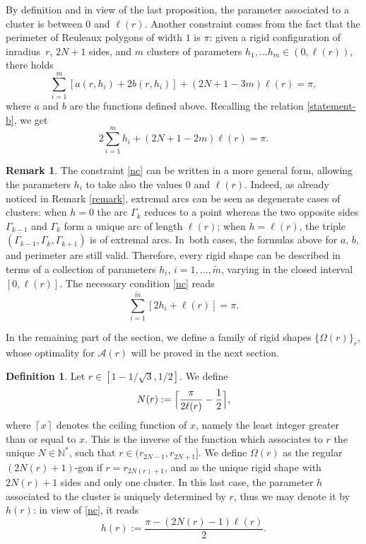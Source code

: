 \documentclass[11pt]{article}
\numberwithin{equation}{section}
\let\mathcal\mathscr
\theoremstyle{plain}
\theoremstyle{definition}
\newtheorem{definition}[theorem]{Definition}
\newtheorem{remark}[theorem]{Remark}
\newcommand\A{\mathcal A}
\let\B\Gamma
\begin{document}
By definition and in view of the last proposition, the parameter associated to a cluster is between $0$ and $\ell(r)$. Another constraint comes from the fact that the perimeter of Reuleaux polygons of width $1$ is $\pi$: given a rigid configuration of inradius~$r$, $2N+1$ sides, and $m$ clusters of parameters $h_1, \ldots h_m \in (0,\ell(r))$, there holds
\[
\sum_{i=1}^m [a(r,h_i) + 2 b(r,h_i)] + (2N+1-3m)\ell(r)=\pi,
\]
where $a$ and $b$ are the functions defined above. Recalling the relation \eqref{statement-b}, we get
\begin{equation}\label{nc}
2 \sum_{i=1}^m h_i + (2N+1-2m)\ell(r)= \pi.
\end{equation}

\begin{remark}\label{rem-cluster}
The constraint \eqref{nc} can be written in a more general form, allowing the parameters $h_i$ to take also the values $0$ and $\ell(r)$. Indeed, as already noticed in Remark \ref{remark}, extremal arcs can be seen as degenerate cases of clusters: when $h=0$ the arc $\B_k$ reduces to a point whereas the two opposite sides $\B_{k-1}$ and $\B_k$ form a unique arc of length $\ell(r)$; when $h=\ell(r)$, the triple $(\B_{k-1},\B_k, \B_{k+1})$ is of extremal arcs. In~both cases, the formulas above for $a$, $b$, and perimeter are still valid. Therefore, every rigid shape can be described in terms of a collection of parameters $h_i$, $i=1,\ldots, \tilde{m}$, varying in the closed interval $[0,\ell(r)]$. The necessary condition \eqref{nc} reads
\begin{equation}\label{nc2}
\sum_{i=1}^{\tilde m} [2 h_i + \ell(r)]= \pi.
\end{equation}
\end{remark}

In the remaining part of the section, we define a family of rigid shapes $\{\Omega(r)\}_r$, whose optimality for $\A(r)$ will be proved in the next section.
\begin{definition}\label{def-optimals} Let $r\in [1-1/\sqrt{3}, 1/2]$. We define
\begin{equation}\label{def-N}
N(r):=\Bigl \lceil{ \frac{\pi}{2\ell(r)}-\frac12 }\Bigr \rceil,
\end{equation}
where $\left \lceil{x}\right \rceil$ denotes the ceiling function of $x$, namely the least integer greater than or equal to $x$. This is the inverse of the function which associates to $r$ the unique $N\in \mathbb N^*$, such that $r\in (r_{2N-1}, r_{2N+1}]$.
We define $\Omega(r)$ as the regular $(2N(r)+1)$-gon if $r=r_{2N(r)+1}$, and as the unique rigid shape with $2N(r)+1$ sides and only one cluster. In this last case, the parameter $h$ associated to the cluster is uniquely determined by $r$, thus we may denote it by $h(r)$: in view of \eqref{nc}, it reads
\begin{equation}\label{uniqueh}
h(r):= \frac{\pi - (2N(r)-1)\ell(r)}{2}.
\end{equation}
\end{definition}
\end{document}
